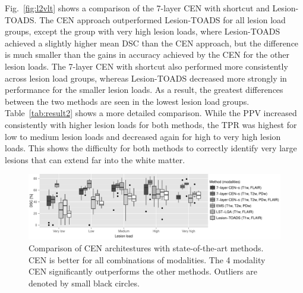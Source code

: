 
Fig.~\ref{fig:l2vlt} shows a comparison of the 7-layer CEN with shortcut and
Lesion-TOADS. The CEN approach outperformed Lesion-TOADS for all lesion load
groups, except the group with very high lesion loads, where Lesion-TOADS
achieved a slightly higher mean DSC than the CEN approach, but the difference is
much smaller than the gains in accuracy achieved by the CEN for the other lesion
loads. The 7-layer CEN with shortcut also performed more consistently across
lesion load groups, whereas Lesion-TOADS decreased more strongly in performance
for the smaller lesion loads. As a result, the greatest differences between the
two methods are seen in the lowest lesion load groups.
Table~\ref{tab:result2} shows a more detailed
comparison. While the PPV increased consistently with higher lesion loads for
both methods, the TPR was highest for low to medium lesion loads and decreased
again for high to very high lesion loads. This shows the difficulty for both
methods to correctly identify very large lesions that can extend far into the
white matter.

\begin{figure}
\centering
\includegraphics[width=\textwidth]{figures/methods}
\caption{Comparison of CEN architestures with state-of-the-art methods. CEN is
better for all combinations of modalities. The 4 modality CEN significantly
outperforms the other methods. Outliers are denoted by small black circles.}
\end{figure}


